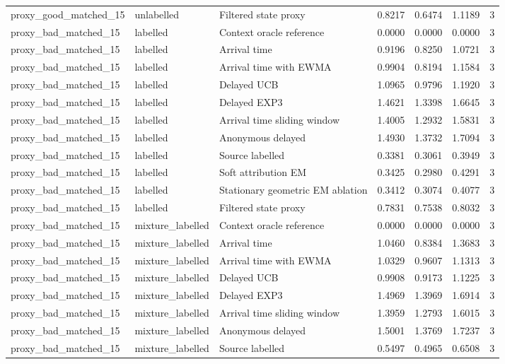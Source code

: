 \begin{tabular}{llllllr}
proxy\_good\_matched\_15 & unlabelled & Filtered state proxy & 0.8217 & 0.6474 & 1.1189 & 3 \\
proxy\_bad\_matched\_15 & labelled & Context oracle reference & 0.0000 & 0.0000 & 0.0000 & 3 \\
proxy\_bad\_matched\_15 & labelled & Arrival time & 0.9196 & 0.8250 & 1.0721 & 3 \\
proxy\_bad\_matched\_15 & labelled & Arrival time with EWMA & 0.9904 & 0.8194 & 1.1584 & 3 \\
proxy\_bad\_matched\_15 & labelled & Delayed UCB & 1.0965 & 0.9796 & 1.1920 & 3 \\
proxy\_bad\_matched\_15 & labelled & Delayed EXP3 & 1.4621 & 1.3398 & 1.6645 & 3 \\
proxy\_bad\_matched\_15 & labelled & Arrival time sliding window & 1.4005 & 1.2932 & 1.5831 & 3 \\
proxy\_bad\_matched\_15 & labelled & Anonymous delayed & 1.4930 & 1.3732 & 1.7094 & 3 \\
proxy\_bad\_matched\_15 & labelled & Source labelled & 0.3381 & 0.3061 & 0.3949 & 3 \\
proxy\_bad\_matched\_15 & labelled & Soft attribution EM & 0.3425 & 0.2980 & 0.4291 & 3 \\
proxy\_bad\_matched\_15 & labelled & Stationary geometric EM ablation & 0.3412 & 0.3074 & 0.4077 & 3 \\
proxy\_bad\_matched\_15 & labelled & Filtered state proxy & 0.7831 & 0.7538 & 0.8032 & 3 \\
proxy\_bad\_matched\_15 & mixture\_labelled & Context oracle reference & 0.0000 & 0.0000 & 0.0000 & 3 \\
proxy\_bad\_matched\_15 & mixture\_labelled & Arrival time & 1.0460 & 0.8384 & 1.3683 & 3 \\
proxy\_bad\_matched\_15 & mixture\_labelled & Arrival time with EWMA & 1.0329 & 0.9607 & 1.1313 & 3 \\
proxy\_bad\_matched\_15 & mixture\_labelled & Delayed UCB & 0.9908 & 0.9173 & 1.1225 & 3 \\
proxy\_bad\_matched\_15 & mixture\_labelled & Delayed EXP3 & 1.4969 & 1.3969 & 1.6914 & 3 \\
proxy\_bad\_matched\_15 & mixture\_labelled & Arrival time sliding window & 1.3959 & 1.2793 & 1.6015 & 3 \\
proxy\_bad\_matched\_15 & mixture\_labelled & Anonymous delayed & 1.5001 & 1.3769 & 1.7237 & 3 \\
proxy\_bad\_matched\_15 & mixture\_labelled & Source labelled & 0.5497 & 0.4965 & 0.6508 & 3 \\

\end{tabular}
